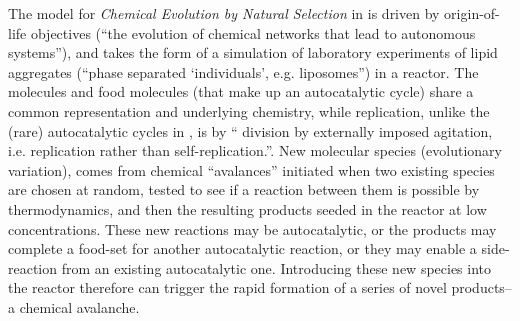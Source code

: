 The model for \emph{Chemical Evolution by Natural Selection} in \cite{Fernando:2008xy,Fernando:2007pf} is driven by origin-of-life objectives (``the evolution of chemical networks that lead to autonomous systems''), and takes the form of a simulation of laboratory experiments of lipid aggregates (``phase separated ‘individuals’, e.g. liposomes'') in a reactor. The molecules and food molecules (that make up an autocatalytic cycle) share a common representation and underlying chemistry, while replication, unlike the (rare) autocatalytic cycles in \cite{Faulconbridge2011}, is by `` division by externally imposed agitation, i.e. replication rather than self-replication.''. New molecular species (evolutionary variation), comes from chemical ``avalances'' initiated when two existing species are chosen at random, tested to see if a reaction between them is possible by thermodynamics, and then the resulting products seeded in the reactor at low concentrations. These new reactions may be autocatalytic, or the products may complete a food-set for another autocatalytic reaction, or they may enable a side-reaction from an existing autocatalytic one. Introducing these new species into the reactor therefore can trigger the rapid formation of a series of novel products--a chemical avalanche.

